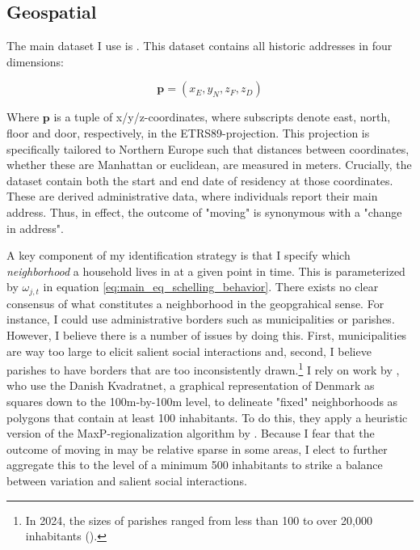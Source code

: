 \documentclass[main.tex]{subfiles}
\begin{document}
\subsection{Geospatial}
\label{sec:data_geospatial}
The main dataset I use is . This dataset contains all historic addresses in four dimensions:

\begin{equation}
    \mathbf{p} = (x_E, y_N, z_F, z_D)
\end{equation}

\noindent
Where $\textbf{p}$ is a tuple of x/y/z-coordinates, where subscripts denote east, north, floor and door, respectively, in the ETRS89-projection. This projection is specifically tailored to Northern Europe such that distances between coordinates, whether these are Manhattan or euclidean, are measured in meters. Crucially, the dataset contain both the start and end date of residency at those coordinates. These are derived administrative data, where individuals report their main address. Thus, in effect, the outcome of "moving" is synonymous with a "change in address". 

A key component of my identification strategy is that I specify which \textit{neighborhood} a household lives in at a given point in time. This is parameterized by $\omega_{j,t}$ in equation \ref{eq:main_eq_schelling_behavior}. There exists no clear consensus of what constitutes a neighborhood in the geopgrahical sense. For instance, I could use administrative borders such as municipalities or parishes. However, I believe there is a number of issues by doing this. First, municipalities are way too large to elicit salient social interactions and, second, I believe parishes to have borders that are too inconsistently drawn.\footnote{In 2024, the sizes of parishes ranged from less than 100 to over 20,000 inhabitants (\textcite{dst_sogn_stats}).} I rely on work by \textcite{nabolagsatlas_neighborhoods_boje2023}, who use the Danish Kvadratnet, a graphical representation of Denmark as squares down to the 100m-by-100m level, to delineate "fixed" neighborhoods as polygons that contain at least 100 inhabitants. To do this, they apply a heuristic version of the MaxP-regionalization algorithm by \textcite{maxp_heuristic_wei2021efficient}. Because I fear that the outcome of moving in may be relative sparse in some areas, I elect to further aggregate this to the level of a minimum 500 inhabitants to strike a balance between variation and salient social interactions. 
\end{document}

